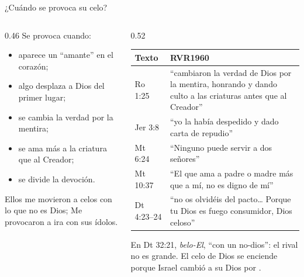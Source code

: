 \begin{frame}{¿Cuándo se provoca su celo?}
\begin{columns}[t,onlytextwidth]
\begin{column}{0.46\textwidth}\footnotesize
Se provoca cuando:
\begin{itemize}\setlength{\itemsep}{0pt}
\item aparece un ``amante'' en el corazón;
\item algo desplaza a Dios del primer lugar;
\item se cambia la verdad por la mentira;
\item se ama más a la criatura que al Creador;
\item se divide la devoción.
\end{itemize}
\begin{cita}Ellos me movieron a celos con lo que no es Dios; Me provocaron a ira con sus ídolos.\end{cita}
\end{column}
\begin{column}{0.52\textwidth}
\scriptsize\renewcommand{\arraystretch}{1.15}
\begin{tabular}{@{}>{\RaggedRight\arraybackslash}p{1.5cm}>{\RaggedRight\arraybackslash}p{4.6cm}@{}}
\toprule
\textbf{Texto} & \textbf{RVR1960} \\ \midrule
Ro 1:25 & ``cambiaron la verdad de Dios por la mentira, honrando y dando culto a las criaturas antes que al Creador'' \\
Jer 3:8 & ``yo la había despedido y dado carta de repudio'' \\
Mt 6:24 & ``Ninguno puede servir a dos señores'' \\
Mt 10:37 & ``El que ama a padre o madre más que a mí, no es digno de mí'' \\
Dt 4:23--24 & ``no os olvidéis del pacto\ldots{} Porque \SENOR{} tu Dios es fuego consumidor, Dios celoso'' \\
\bottomrule
\end{tabular}\par\smallskip
En Dt 32:21,  \emph{belo-El}, ``con un no-dios'': el rival no es grande. El celo de Dios se enciende porque Israel cambió a su Dios por .
\end{column}
\end{columns}
\end{frame}

